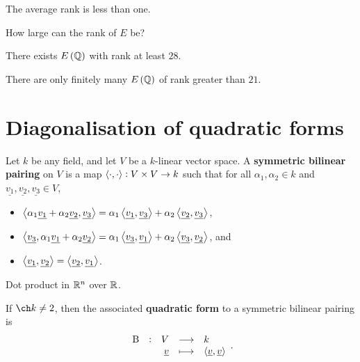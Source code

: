 \begin{theorem}
The average rank is less than one.
\end{theorem}

How large can the rank of $ E $ be?

\begin{theorem}[Elkies 2006]
There exists $ E\br{\QQ} $ with rank at least $ 28 $.
\end{theorem}

\begin{conjecture}
There are only finitely many $ E\br{\QQ} $ of rank greater than $ 21 $.
\end{conjecture}

\pagebreak

\appendix

\section{Diagonalisation of quadratic forms}

\begin{definition}
Let $ k $ be any field, and let $ V $ be a $ k $-linear vector space. A \textbf{symmetric bilinear pairing} on $ V $ is a map $ \left\langle \cdot, \cdot \right\rangle : V \times V \to k $ such that for all $ \alpha_1, \alpha_2 \in k $ and $ \underline{v_1}, \underline{v_2}, \underline{v_3} \in V $,
\begin{itemize}
\item $ \left\langle \alpha_1\underline{v_1} + \alpha_2\underline{v_2}, \underline{v_3} \right\rangle = \alpha_1\left\langle \underline{v_1}, \underline{v_3} \right\rangle + \alpha_2\left\langle \underline{v_2}, \underline{v_3} \right\rangle $,
\item $ \left\langle \underline{v_3}, \alpha_1\underline{v_1} + \alpha_2\underline{v_2} \right\rangle = \alpha_1\left\langle \underline{v_3}, \underline{v_1} \right\rangle + \alpha_2\left\langle \underline{v_3}, \underline{v_2} \right\rangle $, and
\item $ \left\langle \underline{v_1}, \underline{v_2} \right\rangle = \left\langle \underline{v_2}, \underline{v_1} \right\rangle $.
\end{itemize}
\end{definition}

\begin{example}
Dot product in $ \mathbb{R}^n $ over $ \mathbb{R} $.
\end{example}

\begin{definition}
If $ \ch k \ne 2 $, then the associated \textbf{quadratic form} to a symmetric bilinear pairing is
$$ \function[\B]{V}{k}{\underline{v}}{\abr{\underline{v}, \underline{v}}}. $$
\end{definition}

